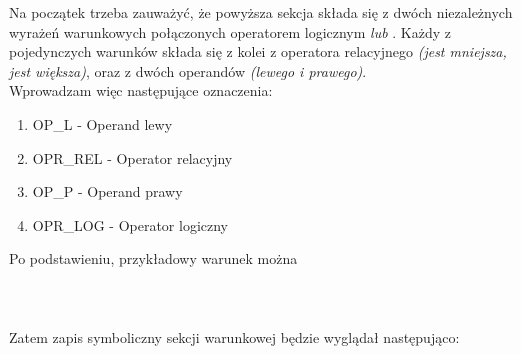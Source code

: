 Na początek trzeba zauważyć, że powyższa sekcja składa się z dwóch niezależnych wyrażeń warunkowych połączonych operatorem logicznym \textit{lub} . Każdy z pojedynczych warunków składa się z kolei z operatora relacyjnego \textit{(jest mniejsza, jest większa)}, oraz z dwóch operandów \textit{(lewego i prawego)}.
\\
Wprowadzam więc następujące oznaczenia:
\begin{enumerate}
	\item OP\_L - Operand lewy
	\item OPR\_REL - Operator relacyjny
	\item OP\_P - Operand prawy
	\item OPR\_LOG - Operator logiczny
\end{enumerate}

Po podstawieniu, przykładowy warunek można  
\\ \\
\\ \\
Zatem zapis symboliczny sekcji warunkowej będzie wyglądał następująco:
\\ \\


